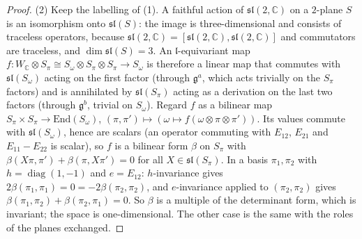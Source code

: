 \documentclass[11pt]{article}
\theoremstyle{definition}
\theoremstyle{plain}
\providecommand{\C}{}\renewcommand{\C}{\mathbb{C}}
\providecommand{\End}{}\renewcommand{\End}{\mathrm{End}}
\providecommand{\Som}{}\renewcommand{\Som}{S_\omega}
\providecommand{\Spi}{}\renewcommand{\Spi}{S_\pi}
\begin{document}
\begin{proof}
(2) Keep the labelling of (1). A faithful action of $\mathfrak{sl}(2,\C)$ on a $2$-plane $S$ is an isomorphism onto $\mathfrak{sl}(S)$: the image is three-dimensional and consists of traceless operators, because $\mathfrak{sl}(2,\C) = [\mathfrak{sl}(2,\C), \mathfrak{sl}(2,\C)]$ and commutators are traceless, and $\dim\mathfrak{sl}(S) = 3$. An $\mathfrak{l}$-equivariant map $f: W_\C\otimes\Spi \cong \Som\otimes\Spi\otimes\Spi \to \Som$ is therefore a linear map that commutes with $\mathfrak{sl}(\Som)$ acting on the first factor (through $\mathfrak{g}^a$, which acts trivially on the $\Spi$ factors) and is annihilated by $\mathfrak{sl}(\Spi)$ acting as a derivation on the last two factors (through $\mathfrak{g}^b$, trivial on $\Som$). Regard $f$ as a bilinear map $\Spi\times\Spi \to \End(\Som)$, $(\pi,\pi') \mapsto (\omega \mapsto f(\omega\otimes\pi\otimes\pi'))$. Its values commute with $\mathfrak{sl}(\Som)$, hence are scalars (an operator commuting with $E_{12}$, $E_{21}$ and $E_{11} - E_{22}$ is scalar), so $f$ is a bilinear form $\beta$ on $\Spi$ with $\beta(X\pi, \pi') + \beta(\pi, X\pi') = 0$ for all $X \in \mathfrak{sl}(\Spi)$. In a basis $\pi_1, \pi_2$ with $h = \operatorname{diag}(1,-1)$ and $e = E_{12}$: $h$-invariance gives $2\beta(\pi_1,\pi_1) = 0 = -2\beta(\pi_2,\pi_2)$, and $e$-invariance applied to $(\pi_2, \pi_2)$ gives $\beta(\pi_1,\pi_2) + \beta(\pi_2,\pi_1) = 0$. So $\beta$ is a multiple of the determinant form, which is invariant; the space is one-dimensional. The other case is the same with the roles of the planes exchanged.

\end{proof}
\end{document}

